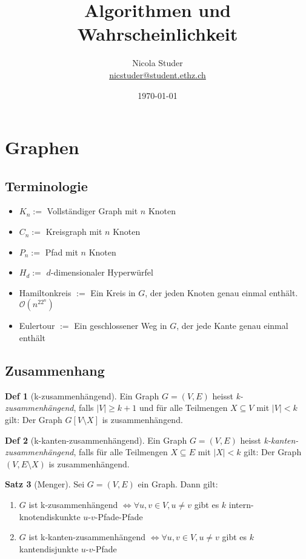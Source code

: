 \documentclass[a4paper, 10pt]{article}
\title{Algorithmen und Wahrscheinlichkeit}
\author{Nicola Studer \\ \href{mailto:nicstuder@student.ethz.ch}{nicstuder@student.ethz.ch}}
\date{\today}
\theoremstyle{definition}
\newtheorem{definition}{Def}[section]
\newtheorem{theorem}[definition]{Satz}
\theoremstyle{named}
\newcommand{\BO}{\mathcal{O}}
\begin{document}
\maketitle

\section{Graphen}
\subsection{Terminologie}
\begin{itemize}
    \item $K_n :=$ Vollständiger Graph mit $n$ Knoten
    \item $C_n :=$ Kreisgraph mit $n$ Knoten
    \item $P_n :=$ Pfad mit $n$ Knoten
    \item $H_d :=$ $d$-dimensionaler Hyperwürfel
    \item Hamiltonkreis $:=$ Ein Kreis in $G$, der jeden Knoten genau einmal enthält. $\BO(n^22^n)$
    \item Eulertour $:=$ Ein geschlossener Weg in $G$, der jede Kante genau einmal enthält
\end{itemize}

\subsection{Zusammenhang}

\setcounter{definition}{22}
\begin{definition}[k-zusammenhängend]
    Ein Graph $G = (V, E)$ heisst \textit{k-zusammenhängend}, falls $|V| \geq k + 1$ und für alle Teilmengen $X \subseteq V$ mit $|V| < k$ gilt: Der Graph $G[V \setminus X]$ is zusammenhängend.
\end{definition}

\begin{definition}[k-kanten-zusammenhängend]
    Ein Graph $G = (V, E)$ heisst \textit{k-kanten-zusammenhängend}, falls für alle Teilmengen $X \subseteq E$ mit $|X| < k$ gilt: Der Graph $(V, E \setminus X)$ is zusammenhängend.
\end{definition}

\begin{theorem}[Menger]
    Sei $G = (V, E)$ ein Graph. Dann gilt:
    \begin{enumerate}[label=\alph*)]
        \item $G$ ist k-zusammenhängend $\iff \forall u,v \in V, u \neq v$ gibt es $k$ intern-knotendiskunkte $u$-$v$-Pfade-Pfade 
        \item $G$ ist k-kanten-zusammenhängend $\iff \forall u,v \in V, u\neq v$ gibt es $k$ kantendisjunkte $u$-$v$-Pfade
    \end{enumerate}
\end{theorem}
\end{document}
